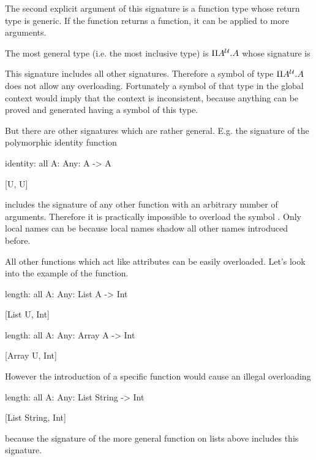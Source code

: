 The second explicit argument of this signature is a function type whose return
type is generic. If the function returns a function, it can be applied to more
arguments.

The most general type (i.e. the most inclusive type) is $\Pi A^{\cal{U}}. A$ whose
signature is
\begin{alba}
    [U]
\end{alba}
%
This signature includes all other signatures. Therefore a symbol of type $\Pi
A^{\cal{U}}. A$ does not allow any overloading. Fortunately a symbol of that type in
the global context would imply that the context is inconsistent, because
anything can be proved and generated having a symbol of this type.

But there are other signatures which are rather general. E.g. the signature of
the polymorphic identity function
%
\begin{alba}
    identity: all {A: Any}: A -> A

        [U, U]
\end{alba}
%
includes the signature of any other function with an arbitrary number of
arguments. Therefore it is practically impossible to overload the symbol
. Only local names can be  because local names
shadow all other names introduced before.

All other functions which act like attributes can be easily overloaded. Let's
look into the example of the  function.

\begin{alba}
    length: all {A: Any}: List A -> Int

        [List U, Int]


    length: all {A: Any}: Array A -> Int

        [Array U, Int]
\end{alba}
%
However the introduction of a specific  function would cause an
illegal overloading
\begin{alba}
    length: all {A: Any}: List String -> Int

        [List String, Int]
\end{alba}
because the signature of the more general  function on lists above
includes this signature.



